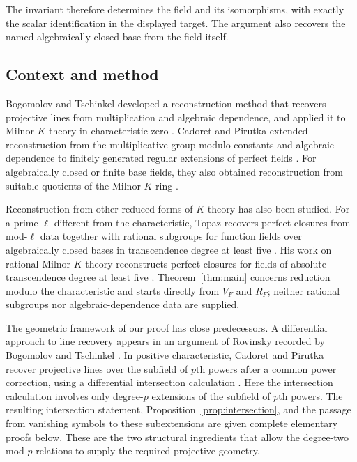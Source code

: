 The invariant therefore determines the field and its isomorphisms, with
exactly the scalar identification in the displayed target. The argument
also recovers the named algebraically closed base from the field itself.

\subsection{Context and method}

Bogomolov and Tschinkel developed a reconstruction method that recovers
projective lines from multiplication and algebraic dependence, and applied
it to Milnor $K$-theory in characteristic zero
\cite{BogomolovTschinkel2009}. Cadoret and Pirutka extended reconstruction
from the multiplicative group modulo constants and algebraic dependence
to finitely generated regular extensions of perfect fields
\cite[Theorem~4]{CadoretPirutka2021}. For algebraically closed or finite
base fields, they also obtained reconstruction from suitable quotients of
the Milnor $K$-ring \cite[Corollary~10]{CadoretPirutka2021}.

Reconstruction from other reduced forms of $K$-theory has also been studied.
For a prime $\ell$ different from the characteristic, Topaz recovers
perfect closures from mod-$\ell$ data together with rational subgroups
for function fields over algebraically closed bases in transcendence
degree at least five \cite[Theorem~B]{Topaz2016}.
His work on rational Milnor $K$-theory reconstructs perfect closures for
fields of absolute transcendence degree at least five
\cite[Main Theorem]{Topaz2023}. Theorem~\ref{thm:main} concerns reduction
modulo the characteristic and starts directly from $V_F$ and $R_F$;
neither rational subgroups nor algebraic-dependence data are supplied.

The geometric framework of our proof has close predecessors. A differential
approach to line recovery appears in an argument of Rovinsky recorded by
Bogomolov and Tschinkel
\cite[Proposition~9]{BogomolovTschinkel2012}. In positive
characteristic, Cadoret and Pirutka recover projective lines over the
subfield of $p$th powers after a common power correction, using a
differential intersection calculation
\cite[Section~1.3, Lemma~23, and Proposition~27]{CadoretPirutka2021}.
Here the intersection calculation involves only degree-$p$ extensions
of the subfield of $p$th powers.
The resulting intersection statement, Proposition~\ref{prop:intersection},
and the passage from vanishing symbols to these subextensions are given
complete elementary proofs below. These are the two structural ingredients
that allow the degree-two mod-$p$ relations to supply the required
projective geometry.

